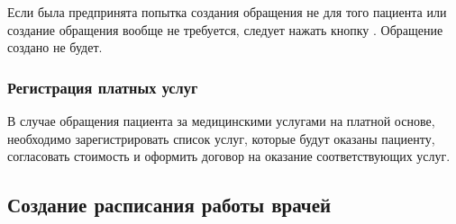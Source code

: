 Если была предпринята попытка создания обращения не для того пациента или создание обращения вообще не требуется, следует нажать кнопку . Обращение создано не будет.

\subsubsection{Регистрация платных услуг}

В случае обращения пациента за медицинскими услугами на платной основе, необходимо зарегистрировать список услуг, которые будут оказаны пациенту, согласовать стоимость и оформить договор на оказание соответствующих услуг.
\subsection{Создание расписания работы врачей} \label{pol_ttbl_new}